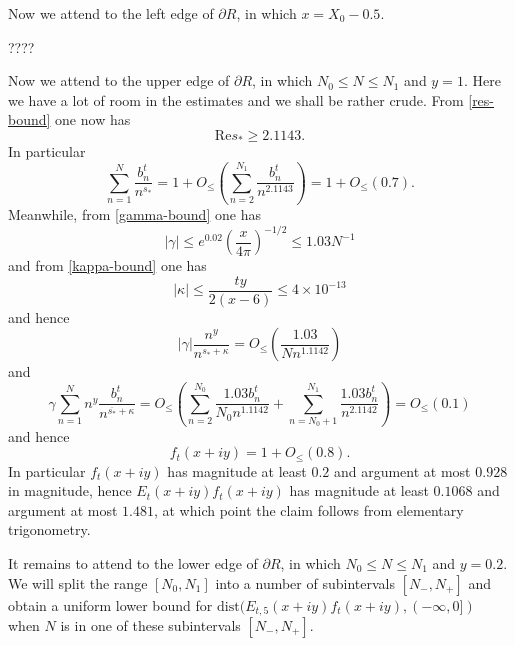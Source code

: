 Now we attend to the left edge of $\partial R$, in which $x = X_0 - 0.5$.

????

Now we attend to the upper edge of $\partial R$, in which $N_0 \leq N \leq N_1$ and $y=1$.  Here we have a lot of room in the estimates and we shall be rather crude.  From \eqref{res-bound} one now has
$$ \mathrm{Re} s_* \geq 2.1143.$$
In particular
$$ \sum_{n=1}^N \frac{b_n^t}{n^{s_*}} = 1 + O_{\leq}( \sum_{n=2}^{N_1} \frac{b_n^t}{n^{2.1143}} ) = 1 + O_{\leq}( 0.7 ).$$
Meanwhile, from \eqref{gamma-bound} one has
$$ |\gamma| \leq e^{0.02} \left( \frac{x}{4\pi} \right)^{-1/2} \leq 1.03 N^{-1}$$
and from \eqref{kappa-bound} one has
$$ |\kappa| \leq \frac{ty}{2(x-6)} \leq 4 \times 10^{-13}$$
and hence
$$ |\gamma| \frac{n^y}{n^{s_* + \kappa}} = O_{\leq}( \frac{1.03}{N n^{1.1142}} )$$
and
$$   \gamma \sum_{n=1}^N n^y \frac{b_n^t}{n^{\overline{s_*} + \kappa}} = O_{\leq}( \sum_{n=2}^{N_0} \frac{1.03 b_n^t}{N_0 n^{1.1142}} + \sum_{n=N_0+1}^{N_1} \frac{1.03 b_n^t}{n^{2.1142}} ) = O_{\leq}( 0.1 )$$
and hence
$$ f_t(x+iy) = 1 + O_{\leq}(0.8).$$
In particular $f_t(x+iy)$ has magnitude at least $0.2$ and argument at most $0.928$ in magnitude, hence $E_t(x+iy) f_t(x+iy)$ has magnitude at least $0.1068$ and argument at most $1.481$, at which point the claim follows from elementary trigonometry.

It remains to attend to the lower edge of $\partial R$, in which $N_0 \leq N \leq N_1$ and $y=0.2$.  We will split the range $[N_0,N_1]$ into a number of subintervals $[N_-,N_+]$ and obtain a uniform lower bound for $\mathrm{dist}( E_{t,5}(x+iy) f_t(x+iy), (-\infty,0])$ when $N$ is in one of these subintervals $[N_-,N_+]$.

